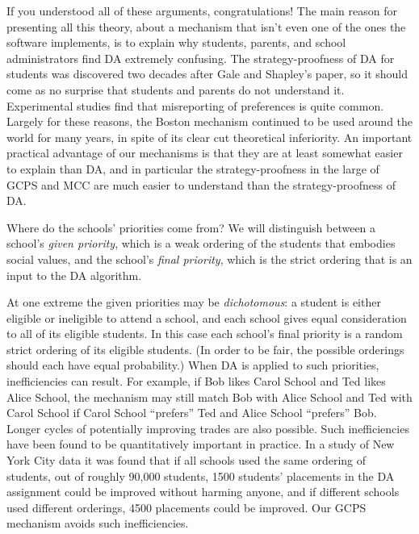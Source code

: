 \documentclass[12pt]{article}
\theoremstyle{definition}
\begin{document}
If you understood all of these arguments, congratulations!  The main
reason for presenting all this theory, about a mechanism that isn't
even one of the ones the software implements, is to explain why
students, parents, and school administrators find DA extremely
confusing.  The strategy-proofness of DA for students was discovered
two decades after Gale and Shapley's paper, so it should come as no
surprise that students and parents do not understand it.  Experimental
studies find that misreporting of preferences is quite common.
Largely for these reasons, the Boston mechanism continued to be used
around the world for many years, in spite of its clear cut theoretical
inferiority.  An important practical advantage of our mechanisms is
that they are at least somewhat easier to explain than DA, and in
particular the strategy-proofness in the large of GCPS and MCC are
much easier to understand than the strategy-proofness of DA.

Where do the schools' priorities come from?  We will distinguish
between a school's \emph{given priority}, which is a weak ordering of
the students that embodies social values, and the school's \emph{final
priority}, which is the strict ordering that is an input to the DA
algorithm.

At one extreme the given priorities may be \emph{dichotomous}: a
student is either eligible or ineligible to attend a school, and each
school gives equal consideration to all of its eligible students.  In
this case each school's final priority is a random strict ordering of
its eligible students.  (In order to be fair, the possible orderings
should each have equal probability.)  When DA is applied to such
priorities, inefficiencies can result.  For example, if Bob likes
Carol School and Ted likes Alice School, the mechanism may still match
Bob with Alice School and Ted with Carol School if Carol School
``prefers'' Ted and Alice School ``prefers'' Bob.  Longer cycles of
potentially improving trades are also possible.  Such inefficiencies
have been found to be quantitatively important in practice.  In a
study of New York City data \citep{apr09aer} it was found that if all
schools used the same ordering of students, out of roughly 90,000
students, 1500 students' placements in the DA assignment could be
improved without harming anyone, and if different schools used
different orderings, 4500 placements could be improved.  Our GCPS
mechanism avoids such inefficiencies.
\end{document}
